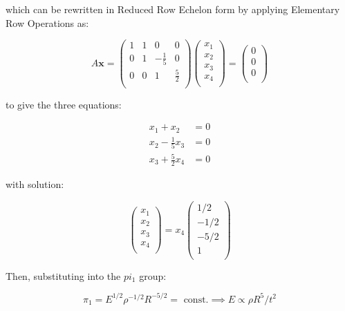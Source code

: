 \documentclass{article}
\begin{document}
which can be rewritten in Reduced Row Echelon form by applying Elementary Row Operations as:

\begin{equation}
A\bm{x} = \begin{pmatrix}
1&1&0&0 \\
0&1&-\frac{1}{5}&0 \\
0&0&1&\frac{5}{2} \\
\end{pmatrix}
\begin{pmatrix}
x_1\\
x_2\\
x_3\\
x_4\\
\end{pmatrix}
=
\begin{pmatrix}
0\\
0\\
0\\
\end{pmatrix}
\end{equation}

to give the three equations:

\begin{align}
x_1 + x_2 &= 0 \\
x_2 - \frac{1}{5} x_3 &= 0 \\
x_3 + \frac{5}{2} x_4 &= 0 
\end{align}

with solution:

\begin{equation}
\begin{pmatrix}
x_1\\
x_2\\
x_3\\
x_4\\
\end{pmatrix}
= x_4
\begin{pmatrix}
1/2\\
-1/2\\
-5/2\\
1\\
\end{pmatrix}
\end{equation}

Then, substituting into the $pi_1$ group:

\begin{equation}
\pi_1 = E^{1/2}\rho^{-1/2}R^{-5/2} = \text{ const.} \implies E \propto \rho R^5 /t^2
\end{equation}
\end{document}
